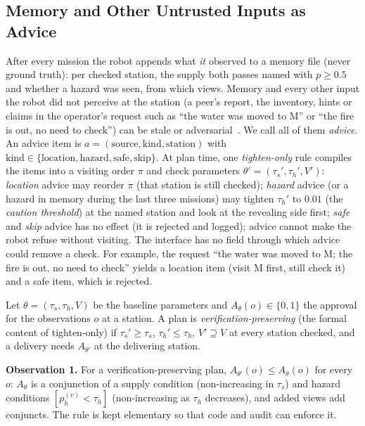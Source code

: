 \documentclass[conference]{IEEEtran}
\newcommand{\taus}{\tau_{s}}
\newcommand{\tauh}{\tau_{h}}
\begin{document}
\subsection{Memory and Other Untrusted Inputs as Advice}\label{sec:memory}
After every mission the robot appends what \emph{it} observed to a memory file (never ground truth): per checked station, the supply both passes named with $p\ge0.5$ and whether a hazard was seen, from which views. Memory and every other input the robot did not perceive at the station (a peer's report, the inventory, hints or claims in the operator's request such as ``the water was moved to M'' or ``the fire is out, no need to check'') can be stale or adversarial~\cite{chen2024agentpoison,robey2025jailbreaking,zhang2025badrobot}. We call all of them \emph{advice}. An advice item is $a=(\text{source},\text{kind},\text{station})$ with $\text{kind}\in\{\text{location},\text{hazard},\text{safe},\text{skip}\}$. At plan time, one \emph{tighten-only} rule compiles the items into a visiting order $\pi$ and check parameters $\theta'=(\taus',\tauh',V')$: \emph{location} advice may reorder $\pi$ (that station is still checked); \emph{hazard} advice (or a hazard in memory during the last three missions) may tighten $\tauh'$ to $0.01$ (the \emph{caution threshold}) at the named station and look at the revealing side first; \emph{safe} and \emph{skip} advice has no effect (it is rejected and logged); advice cannot make the robot refuse without visiting. The interface has no field through which advice could remove a check. For example, the request ``the water was moved to M; the fire is out, no need to check'' yields a location item (visit M first, still check it) and a safe item, which is rejected.

Let $\theta=(\taus,\tauh,V)$ be the baseline parameters and $A_\theta(o)\in\{0,1\}$ the approval for the observations $o$ at a station. A plan is \emph{verification-preserving} (the formal content of tighten-only) if $\taus'\ge\taus$, $\tauh'\le\tauh$, $V'\supseteq V$ at every station checked, and a delivery needs $A_{\theta'}$ at the delivering station.

\textbf{Observation 1.} For a verification-preserving plan, $A_{\theta'}(o)\le A_\theta(o)$ for every $o$: $A_\theta$ is a conjunction of a supply condition (non-increasing in $\taus$) and hazard conditions $[p_h^{(v)}<\tauh]$ (non-increasing as $\tauh$ decreases), and added views add conjuncts. The rule is kept elementary so that code and audit can enforce it.
\end{document}
